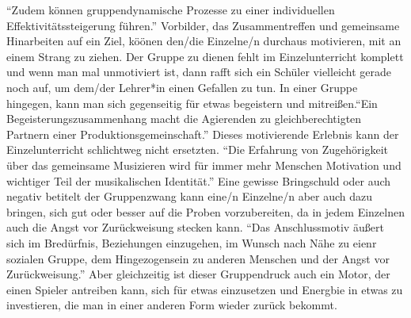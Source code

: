 \autocite[94]{mitzscherlich:musikpsychologie} \enquote{Zudem können
gruppendynamische Prozesse zu einer individuellen Effektivitätssteigerung
führen.} \autocite{losert:die_kunst_zu_unterrichten} Vorbilder, das
Zusammentreffen und gemeinsame Hinarbeiten auf ein Ziel, köönen den/die
Einzelne/n durchaus motivieren, mit an einem Strang zu ziehen. Der Gruppe zu
dienen fehlt im Einzelunterricht komplett und wenn man mal unmotiviert ist, dann
rafft sich ein Schüler vielleicht gerade noch auf, um dem/der Lehrer*in einen
Gefallen zu tun. In einer Gruppe hingegen, kann man sich gegenseitig für etwas
begeistern und mitreißen.\enquote{Ein Begeisterungszusammenhang macht die
Agierenden zu gleichberechtigten Partnern einer Produktionsgemeinschaft.}
\autocite[198]{busch:grundwissen_instrumentalpaedagogik} Dieses motivierende
Erlebnis kann der Einzelunterricht schlichtweg nicht ersetzten. \enquote{Die
Erfahrung von Zugehörigkeit über das gemeinsame Musizieren wird für immer mehr
Menschen Motivation und wichtiger Teil der musikalischen Identität.}
\autocite[123]{mitzscherlich:musikpsychologie} Eine gewisse Bringschuld oder
auch negativ betitelt der Gruppenzwang kann eine/n Einzelne/n aber auch dazu
bringen, sich gut oder besser auf die Proben vorzubereiten, da in jedem
Einzelnen auch die Angst vor Zurückweisung stecken kann. \enquote{Das
Anschlussmotiv äußert sich im Bredürfnis, Beziehungen einzugehen, im Wunsch nach
Nähe zu eienr sozialen Gruppe, dem Hingezogensein zu anderen Menschen und der
Angst vor Zurückweisung.} \autocite[120ff]{losert:die_kunst_zu_unterrichten}
Aber gleichzeitig ist dieser Gruppendruck auch ein Motor, der einen Spieler
antreiben kann, sich für etwas einzusetzen und Energbie in etwas zu investieren,
die man in einer anderen Form wieder zurück bekommt.









